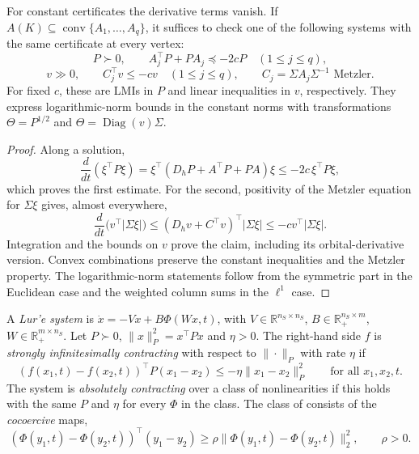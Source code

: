 For constant certificates the derivative terms vanish. If
$A(K)\subseteq\operatorname{conv}\{A_1,\ldots,A_q\}$, it suffices to check
one of the following systems with the same certificate at every vertex:
\begin{equation}\label{HG:LMI}
 P\succ0,\qquad A_j^\top P+PA_j\preceq-2cP\quad(1\le j\le q),
\end{equation}
\begin{equation}\label{HG:LP}
 v\gg0,\qquad C_j^\top v\le-cv\quad(1\le j\le q),
 \qquad C_j=\Sigma A_j\Sigma^{-1}\text{ Metzler}.
\end{equation}
For fixed $c$, these are LMIs in $P$ and linear inequalities in $v$,
respectively. They express logarithmic-norm bounds in the constant norms
with transformations $\Theta=P^{1/2}$ and
$\Theta=\operatorname{Diag}(v)\Sigma$.
\eeP
\begin{proof}
Along a solution,
\[
 \frac{d}{dt}(\xi^\top P\xi)
 =\xi^\top(D_hP+A^\top P+PA)\xi
 \le-2c\,\xi^\top P\xi,
\]
which proves the first estimate. For the second, positivity of the
Metzler equation for $\Sigma\xi$ gives, almost everywhere,
\[
 \frac{d}{dt}\bigl(v^\top|\Sigma\xi|\bigr)
 \le(D_hv+C^\top v)^\top|\Sigma\xi|
 \le-cv^\top|\Sigma\xi|.
\]
Integration and the bounds on $v$ prove the claim, including its
orbital-derivative version. Convex combinations preserve the constant
inequalities and the Metzler property. The logarithmic-norm statements
follow from the symmetric part in the Euclidean case and the weighted
column sums in the $\ell^1$ case.
\end{proof}

A \emph{Lur'e system} is $\dot x=-Vx+B\Phi(Wx,t)$, with $V\in\mathbb R^{n_S\times n_S}$,
$B\in\mathbb R_+^{n_S\times m}$, $W\in\mathbb R_+^{m\times n_S}$. Let $P\succ0$, $\|x\|_P^2=x^\top Px$ and
$\eta>0$. The right-hand side $f$ is \emph{strongly infinitesimally contracting} with respect to
$\|\cdot\|_P$ with rate $\eta$ if
\[
 (f(x_1,t)-f(x_2,t))^\top P(x_1-x_2)\le-\eta\|x_1-x_2\|_P^2
 \qquad\text{for all }x_1,x_2,t.
\]
The system is \emph{absolutely contracting} over a class of nonlinearities if this holds with
the same $P$ and $\eta$ for every $\Phi$ in the class. The class of
\cite{davydov2024exponential} consists of the \emph{cocoercive} maps,
\[
 (\Phi(y_1,t)-\Phi(y_2,t))^\top(y_1-y_2)\ge\rho\|\Phi(y_1,t)-\Phi(y_2,t)\|_2^2,
 \qquad\rho>0.
\]
\eeD

